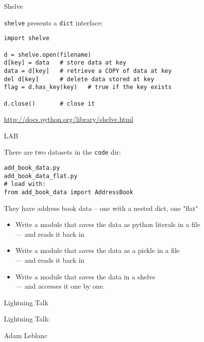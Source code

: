 \documentclass{beamer}
\begin{document}
\begin{frame}[fragile]{Shelve}

{\Large \verb|shelve| presents a \verb|dict| interface:}
\begin{verbatim}
import shelve

d = shelve.open(filename) 
d[key] = data   # store data at key 
data = d[key]   # retrieve a COPY of data at key 
del d[key]      # delete data stored at key 
flag = d.has_key(key)   # true if the key exists

d.close()       # close it
\end{verbatim}

\vfill
\url{http://docs.python.org/library/shelve.html}
\end{frame} 

\begin{frame}[fragile]{LAB}

{\large There are two datasets in the \verb|code| dir:}

\begin{verbatim}
add_book_data.py
add_book_data_flat.py
# load with:
from add_book_data import AddressBook
\end{verbatim}

They have address book data -- one with a nested dict, one "flat"

\begin{itemize}
  \item Write a module that saves the data as python literals in a file\\
        --- and reads it back in
  \item Write a module that saves the data as a pickle in a file\\
        --- and reads it back in
  \item Write a module that saves the data in a shelve\\
        --- and accesses it one by one.
\end{itemize}

\end{frame}

\begin{frame}{Lightning Talk}

{\LARGE Lightning Talk:}

\vfill
{\Large Adam Leblanc}

\vfill

\end{frame}
\end{document}
